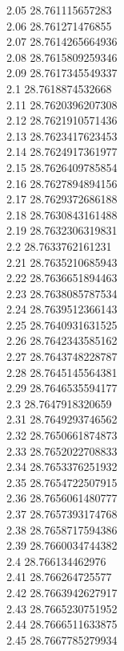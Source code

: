 {2.05	28.761115657283\\
2.06	28.761271476855\\
2.07	28.7614265664936\\
2.08	28.7615809259346\\
2.09	28.7617345549337\\
2.1	28.7618874532668\\
2.11	28.7620396207308\\
2.12	28.7621910571436\\
2.13	28.7623417623453\\
2.14	28.7624917361977\\
2.15	28.7626409785854\\
2.16	28.7627894894156\\
2.17	28.7629372686188\\
2.18	28.7630843161488\\
2.19	28.7632306319831\\
2.2	28.7633762161231\\
2.21	28.7635210685943\\
2.22	28.7636651894463\\
2.23	28.7638085787534\\
2.24	28.7639512366143\\
2.25	28.7640931631525\\
2.26	28.7642343585162\\
2.27	28.7643748228787\\
2.28	28.7645145564381\\
2.29	28.7646535594177\\
2.3	28.7647918320659\\
2.31	28.7649293746562\\
2.32	28.7650661874873\\
2.33	28.7652022708833\\
2.34	28.7653376251932\\
2.35	28.7654722507915\\
2.36	28.7656061480777\\
2.37	28.7657393174768\\
2.38	28.7658717594386\\
2.39	28.7660034744382\\
2.4	28.766134462976\\
2.41	28.766264725577\\
2.42	28.7663942627917\\
2.43	28.7665230751952\\
2.44	28.7666511633875\\
2.45	28.7667785279934\\
}
